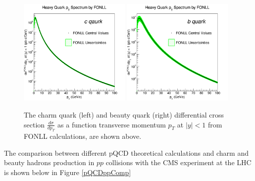  \begin{figure}[hbtp]
\begin{center}
\includegraphics[width=0.48\textwidth]{Figures/Chapter1/Charm.png}
\includegraphics[width=0.48\textwidth]{Figures/Chapter1/Beauty.png}
\caption{The charm quark (left) and beauty quark (right) differential cross section $\frac{d\sigma}{dp_T}$ as a function transverse momentum $p_T$ at $|y| < 1$ from FONLL calculations, are shown above.}
\label{FONLL}
\end{center}
\end{figure}   

The comparison between different pQCD theoretical calculations and charm \cite{CMSD0RAA} and beauty \cite{CMSBPRAA} hadrons production in $pp$ collisions with the CMS experiment at the LHC is shown below in Figure \ref{pQCDppComp}   

